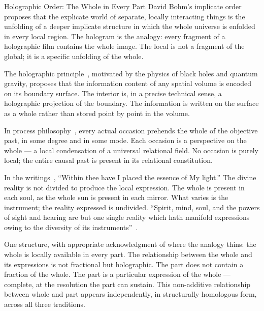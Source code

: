\begin{convergencemoment}{Holographic Order: The Whole in Every Part}
David Bohm's implicate order~\citep{Bohm1980} proposes that the explicate world of separate, locally interacting things is the unfolding of a deeper implicate structure in which the whole universe is enfolded in every local region.
The hologram is the analogy: every fragment of a holographic film contains the whole image.
The local is not a fragment of the global; it is a specific unfolding of the whole.

The holographic principle~\citep{tHooft1993,Susskind1995}, motivated by the physics of black holes and quantum gravity, proposes that the information content of any spatial volume is encoded on its boundary surface.
The interior is, in a precise technical sense, a holographic projection of the boundary.
The information is written on the surface as a whole rather than stored point by point in the volume.

In process philosophy~\citep{Whitehead1929}, every actual occasion prehends the whole of the objective past, in some degree and in some mode.
Each occasion is a perspective on the whole --- a local condensation of a universal relational field.
No occasion is purely local; the entire causal past is present in its relational constitution.

In the \bahai writings~\citep[Arabic no.~12]{HiddenWords}, ``Within thee have I placed the essence of My light.''
The divine reality is not divided to produce the local expression.
The whole is present in each soul, as the whole sun is present in each mirror.
What varies is the instrument; the reality expressed is undivided.
``Spirit, mind, soul, and the powers of sight and hearing are but one single reality which hath manifold expressions owing to the diversity of its instruments''~\citep[para.~35]{SummonsLordHosts}.

One structure, with appropriate acknowledgment of where the analogy thins: the whole is locally available in every part.
The relationship between the whole and its expressions is not fractional but holographic.
The part does not contain a fraction of the whole.
The part is a particular expression of the whole --- complete, at the resolution the part can sustain.
This non-additive relationship between whole and part appears independently, in structurally homologous form, across all three traditions.
\end{convergencemoment}
